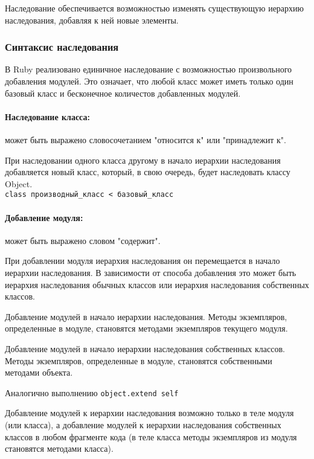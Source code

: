 Наследование обеспечивается возможностью изменять существующую иерархию наследования, добавляя к ней новые элементы.

\subsubsection*{Синтаксис наследования}

В Ruby реализовано единичное наследование с возможностью произвольного добавления модулей. Это означает, что любой класс может иметь только один базовый класс и бесконечное количестов добавленных модулей.

\paragraph*{Наследование класса:} может быть выражено словосочетанием "относится к" или "принадлежит к".

При наследовании одного класса другому в начало иерархии наследования добавляется новый класс, который, в свою очередь, будет наследовать классу Object.
\\\verb!class производный_класс < базовый_класс!

\paragraph*{Добавление модуля:} может быть выражено словом "содержит".

При добавлении модуля иерархия наследования он перемещается в начало иерархии наследования. В зависимости от способа добавления это может быть иерархия наследования обычных классов или иерархия наследования собственных классов.

\begin{methodlist}
  Добавление модулей в начало иерархии наследования. Методы экземпляров, определенные в модуле, становятся методами экземпляров текущего модуля.

  Добавление модулей в начало иерархии наследования собственных классов. Методы экземпляров, определенные в модуле, становятся собственными методами объекта.

  Аналогично выполнению \verb!object.extend self!
\end{methodlist}

Добавление модулей к иерархии наследования возможно только в теле модуля (или класса), а добавление модулей к иерархии наследования собственных классов в любом фрагменте кода (в теле класса методы экземпляров из модуля становятся методами класса).

